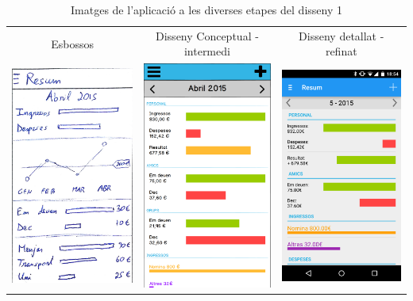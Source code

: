 \begin{table}
\caption{Imatges de l'aplicació a les diverses etapes del disseny 1}
\label{table:images_app1}
\begin{tabular}{| c | c | c |}
\hline
Esbossos & Disseny Conceptual - intermedi & Disseny detallat - refinat \\
\includegraphics[width=50mm]{1_Dashboard.jpg} &
\includegraphics[width=50mm]{2_Dashboard.png} &
\includegraphics[width=50mm]{3_Dashboard.png} \\

\end{tabular}
\end{table}
